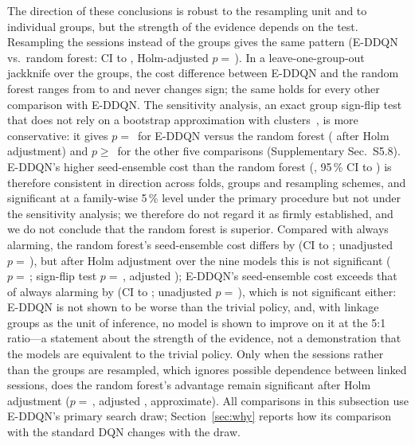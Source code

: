 The direction of these conclusions is robust to the resampling unit and to individual groups, but the strength of the evidence depends on the test. Resampling the \nSessionsEval{} sessions instead of the groups gives the same pattern (E-DDQN vs.\ random forest: CI \PHSesRFLow{} to \PHSesRFHigh, Holm-adjusted $p=$\,\PHSesRFHolm). In a leave-one-group-out jackknife over the \PHJkGroups{} groups, the cost difference between E-DDQN and the random forest ranges from \PHJkEDDQNvsRFMin{} to \PHJkEDDQNvsRFMax{} and never changes sign; the same holds for every other comparison with E-DDQN. The sensitivity analysis, an exact group sign-flip test that does not rely on a bootstrap approximation with \nGroupsEval{} clusters~\cite{cameron2008bootstrap}, is more conservative: it gives $p=$\,\PHSfRFP{} for E-DDQN versus the random forest (\PHSfRFHolm{} after Holm adjustment) and $p\ge$\,\PHSfECBP{} for the other five comparisons (Supplementary Sec.~S5.8). E-DDQN's higher seed-ensemble cost than the random forest (\PairDOneRFCostDiff, 95\,\% CI \PairDOneRFCostLo{} to \PairDOneRFCostHi) is therefore consistent in direction across folds, groups and resampling schemes, and significant at a family-wise 5\,\% level under the primary procedure but not under the sensitivity analysis; we therefore do not regard it as firmly established, and we do not conclude that the random forest is superior. Compared with always alarming, the random forest's seed-ensemble cost differs by \PHAlwRFGrp{} (CI \PHAlwRFGrpLow{} to \PHAlwRFGrpHigh; unadjusted $p=$\,\PHAlwRFGrpP), but after Holm adjustment over the nine models this is not significant ($p=$\,\PHAlwRFGrpHolm; sign-flip test $p=$\,\PHSfAlwaysRFP, adjusted \PHSfAlwaysRFHolm); E-DDQN's seed-ensemble cost exceeds that of always alarming by \PHAlwEDDQNGrp{} (CI \PHAlwEDDQNGrpLow{} to \PHAlwEDDQNGrpHigh; unadjusted $p=$\,\PHAlwEDDQNGrpP), which is not significant either: E-DDQN is not shown to be worse than the trivial policy, and, with linkage groups as the unit of inference, no model is shown to improve on it at the 5:1 ratio---a statement about the strength of the evidence, not a demonstration that the models are equivalent to the trivial policy. Only when the \nSessionsEval{} sessions rather than the groups are resampled, which ignores possible dependence between linked sessions, does the random forest's advantage remain significant after Holm adjustment ($p=$\,\PHAlwRFSesP, adjusted \PHAlwRFSesHolm, approximate). All comparisons in this subsection use E-DDQN's primary search draw; Section~\ref{sec:why} reports how its comparison with the standard DQN changes with the draw.

